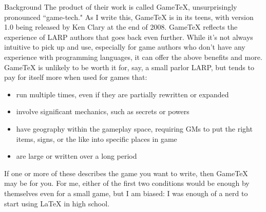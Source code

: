 \documentclass{article}
\newcommand{\gametex}{GameTeX}
\begin{document}
\begin{section}{Background}
The product of their work is called GameTeX, unsurprisingly pronounced ``game-tech." As I write this, \gametex{} is in its teens, with version 1.0 being released by Ken Clary at the end of 2008.  \gametex{} reflects the experience of LARP authors that goes back even further.  While it's not always intuitive to pick up and use, especially for game authors who don't have any experience with programming languages, it can offer the above benefits and more.  \gametex{} is unlikely to be worth it for, say, a small parlor LARP, but tends to pay for itself more when used for games that:
\begin{itemize}
\item run multiple times, even if they are partially rewritten or expanded
\item involve significant mechanics, such as secrets or powers
\item have geography within the gameplay space, requiring GMs to put the right items, signs, or the like into specific places in game
\item are large or written over a long period
\end{itemize}

If one or more of these describes the game you want to write, then \gametex{} may be for you.  For me, either of the first two conditions would be enough by themselves even for a small game, but I am biased: I was enough of a nerd to start using \LaTeX{} in high school.
\end{section}
\end{document}
